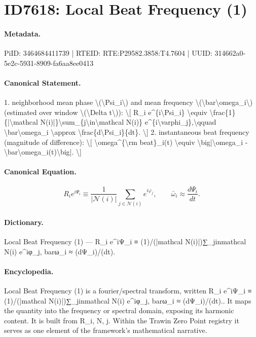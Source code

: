 \section*{ID7618: Local Beat Frequency (1)}
\paragraph{Metadata.}
PiID: 3464684411739 | RTEID: RTE:P29582.3858:T4.7604 | UUID: 314662a0-5e2c-5931-8909-fa6aa8ee0413

\paragraph{Canonical Statement.}
1. neighborhood mean phase \textbackslash{}(\textbackslash{}Psi\_i\textbackslash{}) and mean frequency \textbackslash{}(\textbackslash{}bar\textbackslash{}omega\_i\textbackslash{}) (estimated over window \textbackslash{}(\textbackslash{}Delta t\textbackslash{})): \textbackslash{}[ R\_i e\textasciicircum{}\{i\textbackslash{}Psi\_i\} \textbackslash{}equiv \textbackslash{}frac\{1\}\{|\textbackslash{}mathcal N(i)|\}\textbackslash{}sum\_\{j\textbackslash{}in\textbackslash{}mathcal N(i)\} e\textasciicircum{}\{i\textbackslash{}varphi\_j\},\textbackslash{}qquad \textbackslash{}bar\textbackslash{}omega\_i \textbackslash{}approx \textbackslash{}frac\{d\textbackslash{}Psi\_i\}\{dt\}. \textbackslash{}] 2. instantaneous beat frequency (magnitude of difference): \textbackslash{}[ \textbackslash{}omega\textasciicircum{}\{\textbackslash{}rm beat\}\_i(t) \textbackslash{}equiv \textbackslash{}big|\textbackslash{}omega\_i - \textbackslash{}bar\textbackslash{}omega\_i(t)\textbackslash{}big|. \textbackslash{}]

\paragraph{Canonical Equation.}
\[
R_i e^{i\Psi_i} \equiv \frac{1}{|\mathcal N(i)|}\sum_{j\in\mathcal N(i)} e^{i\varphi_j},\qquad \bar\omega_i \approx \frac{d\Psi_i}{dt}.
\]

\paragraph{Dictionary.}
Local Beat Frequency (1) — R\_i e\textasciicircum{}iΨ\_i ≡ (1)/(|mathcal N(i)|)∑\_jinmathcal N(i) e\textasciicircum{}iφ\_j, barω\_i ≈ (dΨ\_i)/(dt).

\paragraph{Encyclopedia.}
Local Beat Frequency (1) is a fourier/spectral transform, written R\_i e\textasciicircum{}iΨ\_i ≡ (1)/(|mathcal N(i)|)∑\_jinmathcal N(i) e\textasciicircum{}iφ\_j, barω\_i ≈ (dΨ\_i)/(dt).. It maps the quantity into the frequency or spectral domain, exposing its harmonic content. It is built from R\_i, N, j. Within the Trawin Zero Point registry it serves as one element of the framework's mathematical narrative.
